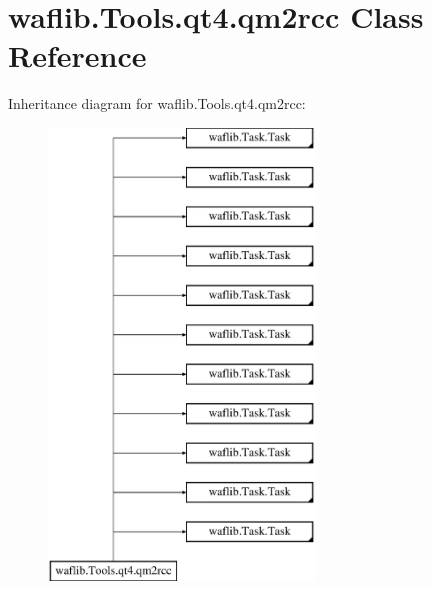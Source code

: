 \hypertarget{classwaflib_1_1_tools_1_1qt4_1_1qm2rcc}{}\section{waflib.\+Tools.\+qt4.\+qm2rcc Class Reference}
\label{classwaflib_1_1_tools_1_1qt4_1_1qm2rcc}
Inheritance diagram for waflib.\+Tools.\+qt4.\+qm2rcc\+:\begin{figure}[H]
\begin{center}
\leavevmode
\includegraphics[height=12.000000cm]{classwaflib_1_1_tools_1_1qt4_1_1qm2rcc}
\end{center}
\end{figure}
